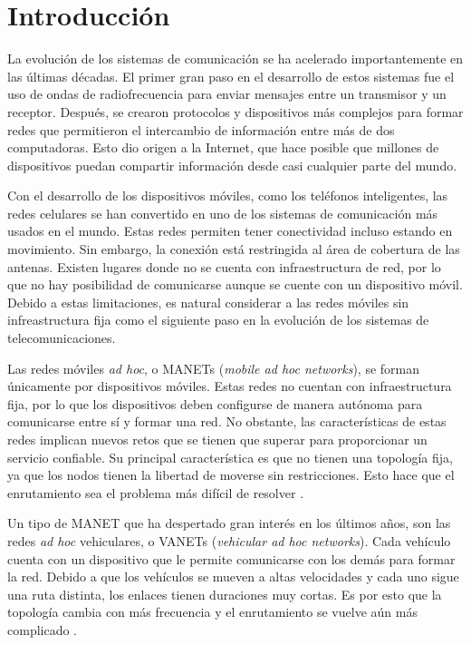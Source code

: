 ﻿%
\chapter{Introducción}

\label{ch:introduccion}

La evolución de los sistemas de comunicación se ha acelerado importantemente en
las últimas décadas. El primer gran paso en el desarrollo de estos sistemas fue
el uso de ondas de radiofrecuencia para enviar mensajes entre un transmisor y
un receptor. Después, se crearon protocolos y dispositivos más complejos para
formar redes que permitieron el intercambio de información entre más de dos
computadoras. Esto dio origen a la Internet, que hace posible que millones de
dispositivos puedan compartir información desde casi cualquier parte del mundo.

Con el desarrollo de los dispositivos móviles, como los teléfonos inteligentes,
las redes celulares se han convertido en uno de los sistemas de comunicación
más usados en el mundo. Estas redes permiten tener conectividad incluso estando
en movimiento. Sin embargo, la conexión está restringida al área de cobertura de
las antenas. Existen lugares donde no se cuenta con infraestructura de red, por
lo que no hay posibilidad de comunicarse aunque se cuente con un dispositivo
móvil. Debido a estas limitaciones, es natural considerar a las redes móviles
sin infreastructura fija como el siguiente paso en la evolución de los sistemas
de telecomunicaciones.

Las redes móviles \textit{ad hoc}, o MANETs (\textit{mobile ad hoc networks}),
se forman únicamente por dispositivos móviles. Estas redes no cuentan con
infraestructura fija, por lo que los dispositivos deben configurse de manera
autónoma para comunicarse entre sí y formar una red. No obstante, las
características de estas redes implican nuevos retos que se tienen que superar
para proporcionar un servicio confiable. Su principal característica es que no
tienen una topología fija, ya que los nodos tienen la libertad de moverse sin
restricciones. Esto hace que el enrutamiento sea el problema más difícil de
resolver \cite{Li2008}.

Un tipo de MANET que ha despertado gran interés en los últimos años, son las
redes \textit{ad hoc} vehiculares, o VANETs (\textit{vehicular ad hoc
networks}). Cada vehículo cuenta con un dispositivo que le permite comunicarse
con los demás para formar la red. Debido a que los vehículos se mueven a altas
velocidades y cada uno sigue una ruta distinta, los enlaces tienen duraciones
muy cortas. Es por esto que la topología cambia con más frecuencia y el
enrutamiento se vuelve aún más complicado \cite{Meneguette2018}.


